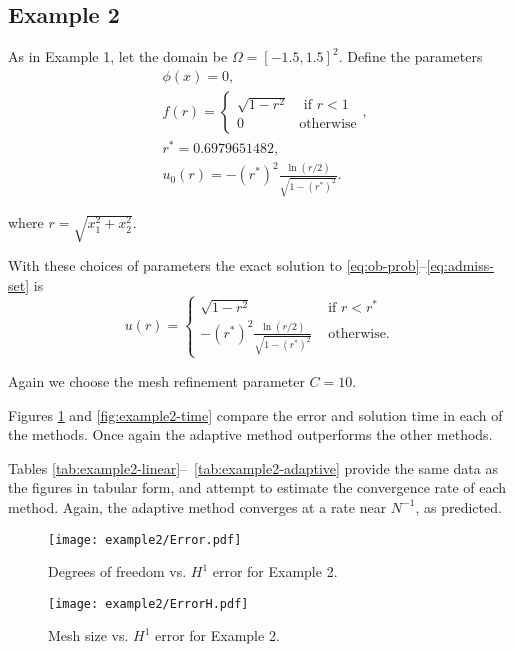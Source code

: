 \documentclass{article}
\begin{document}
\subsection{Example 2}
As in Example 1, let the domain be $\Omega=[-1.5,1.5]^2$. Define the parameters
\begin{align}
  &\phi(x)=0, \label{ex2-phi}\\
  &f(r)=\begin{cases}\sqrt{1-r^2}&\text{ if } r<1 \\
                                  0&\text{otherwise}\end{cases},\label{ex2-f}\\
  &r^*=0.6979651482,\\
  &u_0(r)=-\left(r^*\right)^2\frac{\ln(r/2)}{\sqrt{1-\left(r^*\right)^2}} \label{ex2-u0}.
\end{align}

where $r=\sqrt{x_1^2+x_2^2}$.

With these choices of parameters the exact solution to
\eqref{eq:ob-prob}--\eqref{eq:admiss-set} is
\begin{equation}
  \label{eq:ex1-u}
u(r)=  \begin{cases}
  \sqrt{1-r^2} &\text{ if } r<r^*\\
  -\left(r^*\right)^2\frac{\ln(r/2)}{\sqrt{1-\left(r^*\right)^2}} & \text{ otherwise.}
\end{cases}
\end{equation}

Again we choose the mesh refinement parameter $C=10$.  

Figures \ref{fig:example2-error} and \ref{fig:example2-time} compare
the error and solution time in each of the methods.  Once again the
adaptive method outperforms the other methods.  

Tables \ref{tab:example2-linear}--~\ref{tab:example2-adaptive} provide
the same data as the figures in tabular form, and attempt to estimate
the convergence rate of each method. Again, the adaptive method
converges at a rate near $N^{-1}$, as predicted.  


\begin{figure}
\texttt{[image: example2/Error.pdf]}
\caption{Degrees of freedom vs. $H^1$ error for Example 2.}
\label{fig:example2-error}
\end{figure}

\begin{figure}
\texttt{[image: example2/ErrorH.pdf]}
\caption{Mesh size vs. $H^1$ error for Example 2.}
\label{fig:example2-herror}
\end{figure}
\end{document}
